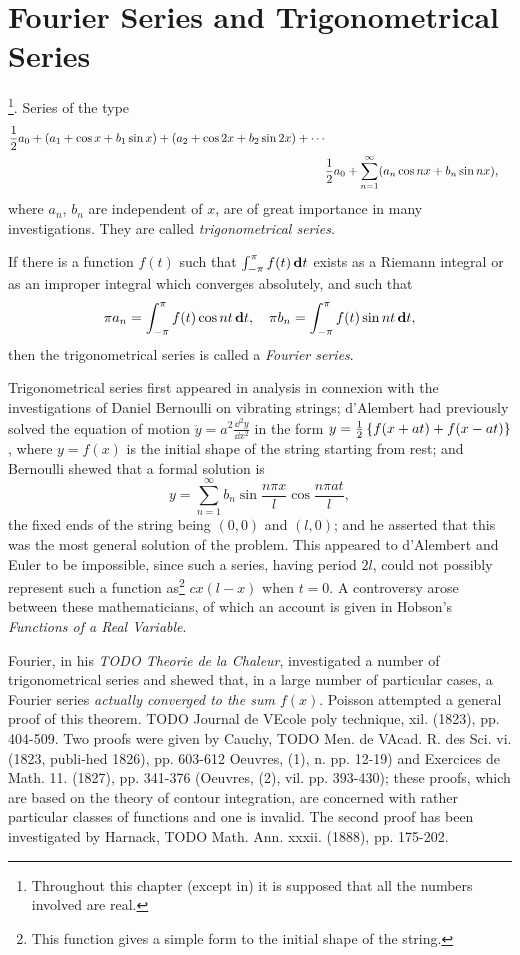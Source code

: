 %
%
\chapter{Fourier Series and Trigonometrical Series}
\footnote{Throughout
  this chapter (except in) it is supposed that all
  the numbers involved are real.}.
Series of the type
\begin{align*}
  \half a_{0}
  + (a_{1} + \cos x + b_{1} \sin x)
  + (a_{2} + \cos 2x + b_{2} \sin 2x)
  + \cdots
  \\
  &
  \hfill
  \half a_{0}
  +
  \sum_{n=1}^{\infty} ( a_{n} \cos n x + b_{n} \sin n x),
\end{align*}
where $a_{n}$, $b_{n}$ are independent of $x$, are of great importance in many
investigations. They are called \emph{trigonometrical series}.

If there is a function $f(t)$ such that
$\int_{-\pi}^{\pi} f(t) \, \mathbf{d} t$ exists as a Riemann
integral or as an improper integral which converges absolutely, and such that
$$
\pi a_{n} = \int_{-\pi}^{\pi} f(t) \cos nt \, \mathbf{d} t,
\quad
\pi b_{n} = \int_{-\pi}^{\pi} f(t) \sin nt \, \mathbf{d} t,
$$
then the trigonometrical series is called a \emph{Fourier series}.

Trigonometrical series first appeared in analysis in connexion with
the investigations of Daniel Bernoulli on vibrating
strings;
d'Alembert had previously solved the equation of
motion
$ \ddot{y} = a^{2} \frac{\dd^{2} y}{\dd x^{2}}$
in the form
$y = \frac{1}{2} \left\{ f(x+at) + f(x-at) \right\}$, where $y=f(x)$ is
the initial shape of the string starting from rest;
and Bernoulli shewed that a formal solution is
$$
y
=
\sum_{n=1}^{\infty}
b_{n}
\sin \frac{n \pi x}{l}
\cos \frac{n \pi a t}{l},
$$
the fixed ends of the string being $(0,0)$ and $(l,0)$; and he asserted
that this was the most general solution of the problem. This appeared
to d'Alembert and Euler to be impossible, since such a series, having
period $2l$, could not possibly represent such a function
as\footnote{This function gives a simple form to the initial shape of the string.}
$c x (l-x)$ when $t = 0$.
A controversy arose between these mathematicians, of which
an account is given in Hobson's \emph{Functions of a Real Variable}.

Fourier, in his \emph{TODO Theorie de la Chaleur}, investigated a number of
trigonometrical series and shewed that, in a large number of
particular cases, a Fourier series \emph{actually converged to the sum $f(x)$}.
Poisson attempted a general proof of this theorem. TODO Journal de VEcole
poly technique, xil. (1823), pp. 404-509. Two proofs were given by
Cauchy, TODO Men. de VAcad. R. des Sci. vi. (1823, publi-hed 1826), pp.
603-612 Oeuvres, (1), n. pp. 12-19) and Exercices de Math. 11. (1827),
pp. 341-376 (Oeuvres, (2), vil. pp. 393-430); these proofs, which are
based on the theory of contour integration, are concerned with rather
particular classes of functions and one is invalid. The second proof
has been investigated by Harnack, TODO Math. Ann. xxxii. (1888), pp.
175-202.


